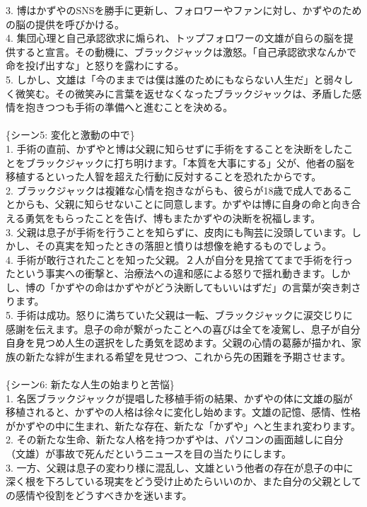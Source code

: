 \documentclass[a4j,12pt]{jsreport}
\begin{document}
\begin{breakitembox}
   3. 博はかずやのSNSを勝手に更新し、フォロワーやファンに対し、かずやのための脳の提供を呼びかける。\\
   4. 集団心理と自己承認欲求に煽られ、トップフォロワーの文雄が自らの脳を提供すると宣言。その動機に、ブラックジャックは激怒。「自己承認欲求なんかで命を投げ出すな」と怒りを露わにする。\\
   5. しかし、文雄は「今のままでは僕は誰のためにもならない人生だ」と弱々しく微笑む。その微笑みに言葉を返せなくなったブラックジャックは、矛盾した感情を抱きつつも手術の準備へと進むことを決める。\\
   \\
   \{シーン5: 変化と激動の中で\}\\
   1. 手術の直前、かずやと博は父親に知らせずに手術をすることを決断をしたことをブラックジャックに打ち明けます。「本質を大事にする」父が、他者の脳を移植するといった人智を超えた行動に反対することを恐れたからです。\\
   2. ブラックジャックは複雑な心情を抱きながらも、彼らが18歳で成人であることからも、父親に知らせないことに同意します。かずやは博に自身の命と向き合える勇気をもらったことを告げ、博もまたかずやの決断を祝福します。\\
   3. 父親は息子が手術を行うことを知らずに、皮肉にも陶芸に没頭しています。しかし、その真実を知ったときの落胆と憤りは想像を絶するものでしょう。\\
   4. 手術が敢行されたことを知った父親。２人が自分を見捨ててまで手術を行ったという事実への衝撃と、治療法への違和感による怒りで揺れ動きます。しかし、博の「かずやの命はかずやがどう決断してもいいはずだ」の言葉が突き刺さります。\\
   5. 手術は成功。怒りに満ちていた父親は一転、ブラックジャックに涙交じりに感謝を伝えます。息子の命が繋がったことへの喜びは全てを凌駕し、息子が自分自身を見つめ人生の選択をした勇気を認めます。父親の心情の葛藤が描かれ、家族の新たな絆が生まれる希望を見せつつ、これから先の困難を予期させます。\\
   \\
   \{シーン6: 新たな人生の始まりと苦悩\}\\
   1. 名医ブラックジャックが提唱した移植手術の結果、かずやの体に文雄の脳が移植されると、かずやの人格は徐々に変化し始めます。文雄の記憶、感情、性格がかずやの中に生まれ、新たな存在、新たな「かずや」へと生まれ変わります。\\
   2. その新たな生命、新たな人格を持つかずやは、パソコンの画面越しに自分（文雄）が事故で死んだというニュースを目の当たりにします。\\
   3. 一方、父親は息子の変わり様に混乱し、文雄という他者の存在が息子の中に深く根を下ろしている現実をどう受け止めたらいいのか、また自分の父親としての感情や役割をどうすべきかを迷います。\\

\end{breakitembox}
\end{document}

